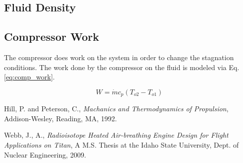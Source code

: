 \subsection{Fluid Density}

\subsection{Compressor Work}
The compressor does work on the system in order to change the stagnation conditions.  The work done by the compressor on the fluid
is modeled via Eq. \ref{eq:comp_work}.

\begin{equation}
\label{eq:comp_work}
W = \dot{m}c_p\left(T_{o2} - T_{o1}\right)
\end{equation}


\begin{thebibliography}{2}

 Hill, P. and Peterson, C., \emph{Machanics and Thermodynamics of Propulsion}, Addison-Wesley, Reading, MA, 1992.

 Webb, J., A., \emph{Radioisotope Heated Air-breathing Engine Design for Flight Applications on Titan}, A M.S. Thesis at
                         the Idaho State University, Dept. of Nuclear Engineering, 2009.
\end{thebibliography}